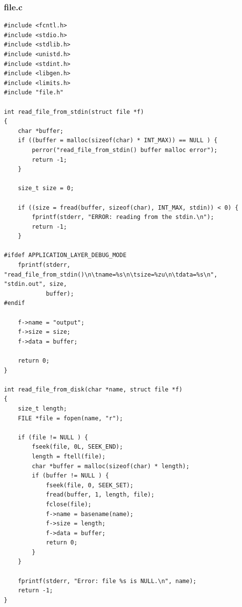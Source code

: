 \documentclass[a4paper,11pt,titlepage]{article}
\begin{document}
\subsubsection*{file.c}
\begin{lstlisting}[style=customcwithlines]
#include <fcntl.h>
#include <stdio.h>
#include <stdlib.h>
#include <unistd.h>
#include <stdint.h>
#include <libgen.h>
#include <limits.h>
#include "file.h"

int read_file_from_stdin(struct file *f)
{
	char *buffer;
	if ((buffer = malloc(sizeof(char) * INT_MAX)) == NULL ) {
		perror("read_file_from_stdin() buffer malloc error");
		return -1;
	}

	size_t size = 0;

	if ((size = fread(buffer, sizeof(char), INT_MAX, stdin)) < 0) {
		fprintf(stderr, "ERROR: reading from the stdin.\n");
		return -1;
	}

#ifdef APPLICATION_LAYER_DEBUG_MODE
	fprintf(stderr, "read_file_from_stdin()\n\tname=%s\n\tsize=%zu\n\tdata=%s\n", "stdin.out", size,
			buffer);
#endif

	f->name = "output";
	f->size = size;
	f->data = buffer;

	return 0;
}

int read_file_from_disk(char *name, struct file *f)
{
	size_t length;
	FILE *file = fopen(name, "r");

	if (file != NULL ) {
		fseek(file, 0L, SEEK_END);
		length = ftell(file);
		char *buffer = malloc(sizeof(char) * length);
		if (buffer != NULL ) {
			fseek(file, 0, SEEK_SET);
			fread(buffer, 1, length, file);
			fclose(file);
			f->name = basename(name);
			f->size = length;
			f->data = buffer;
			return 0;
		}
	}

	fprintf(stderr, "Error: file %s is NULL.\n", name);
	return -1;
}
\end{lstlisting}
\end{document}
